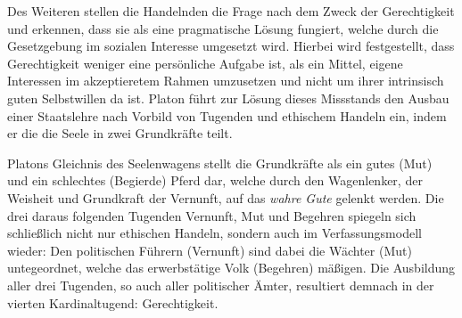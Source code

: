 Des Weiteren stellen die Handelnden die Frage nach dem Zweck der Gerechtigkeit und erkennen, 
dass sie als eine pragmatische Lösung fungiert, welche durch die Gesetzgebung im sozialen Interesse umgesetzt wird.
Hierbei wird festgestellt, dass Gerechtigkeit weniger eine persönliche Aufgabe ist, als ein Mittel, 
eigene Interessen im akzeptieretem Rahmen umzusetzen und nicht um ihrer intrinsisch guten Selbstwillen da ist.
Platon führt zur Lösung dieses Missstands den Ausbau einer Staatslehre nach Vorbild von Tugenden und ethischem Handeln ein,
indem er die die Seele in zwei Grundkräfte teilt.

Platons Gleichnis des Seelenwagens stellt die Grundkräfte als ein gutes (Mut) und ein schlechtes (Begierde) Pferd dar, 
welche durch den Wagenlenker, der Weisheit und Grundkraft der Vernunft, auf das \textit{wahre Gute} gelenkt werden.
Die drei daraus folgenden Tugenden Vernunft, Mut und Begehren spiegeln sich schließlich nicht nur ethischen Handeln,
sondern auch im Verfassungsmodell wieder:
Den politischen Führern (Vernunft) sind dabei die Wächter (Mut) untegeordnet, welche das erwerbstätige Volk (Begehren) mäßigen.
Die Ausbildung aller drei Tugenden, so auch aller politischer Ämter, 
resultiert demnach in der vierten Kardinaltugend: Gerechtigkeit.



